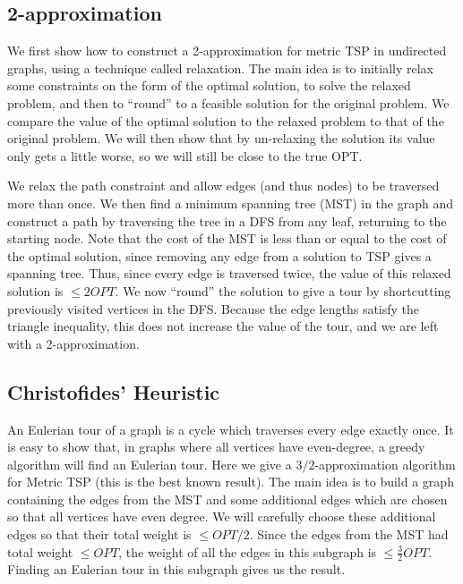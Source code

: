 \documentclass{article}
\begin{document}
\subsection{2-approximation}

We first show how to construct a 2-approximation for metric TSP in
undirected graphs, using a technique called relaxation. The main idea
is to initially relax some constraints on the form of the optimal
solution, to solve the relaxed problem, and then to ``round'' to a
feasible solution for the original problem. We compare the value of
the optimal solution to the relaxed problem to that of the original
problem. We will then show that by un-relaxing the solution its value
only gets a little worse, so we will still be close to the true OPT.

We relax the path constraint and allow edges (and thus nodes) to be
traversed more than once. We then find a minimum spanning tree (MST)
in the graph and construct a path by traversing the tree in a DFS from
any leaf, returning to the starting node. Note that the cost of the
MST is less than or equal to the cost of the optimal solution, since
removing any edge from a solution to TSP gives a spanning tree. Thus,
since every edge is traversed twice, the value of this relaxed
solution is $\le 2OPT$. We now ``round'' the solution to give a tour by
shortcutting previously visited vertices in the DFS. Because the
edge lengths satisfy the triangle inequality, this does not increase
the value of the tour, and we are left with a 2-approximation.

\subsection{Christofides' Heuristic}

An Eulerian tour of a graph is a cycle which traverses every edge
exactly once. It is easy to show that, in graphs where all vertices
have even-degree, a greedy algorithm will find an Eulerian tour. Here
we give a $3/2$-approximation algorithm for Metric TSP (this is the
best known result). The main idea is to build a graph containing the
edges from the MST and some additional edges which are chosen so that
all vertices have even degree. We will carefully choose these
additional edges so that their total weight is $\le OPT/2$. Since the
edges from the MST had total weight $\le OPT$, the weight of all the
edges in this subgraph is $\le \frac{3}{2}OPT$. Finding an Eulerian
tour in this subgraph gives us the result.
\end{document}
